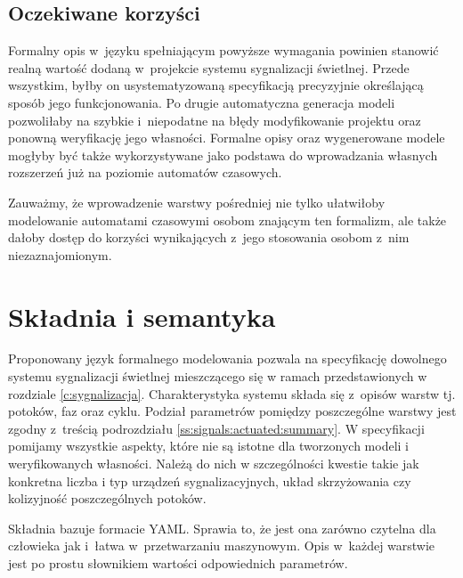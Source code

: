 \documentclass{pracamgr}
\theoremstyle{plain}
\begin{document}
\subsection{Oczekiwane korzyści}
\label{ss:lang:req:benefits}
Formalny opis w~języku spełniającym powyższe wymagania powinien
stanowić realną wartość dodaną w~projekcie systemu sygnalizacji
świetlnej. Przede wszystkim, byłby on usystematyzowaną
specyfikacją precyzyjnie określającą sposób jego funkcjonowania. Po
drugie automatyczna generacja modeli pozwoliłaby na szybkie
i~niepodatne na błędy modyfikowanie projektu oraz ponowną weryfikację jego
własności. Formalne opisy oraz wygenerowane modele mogłyby być także
wykorzystywane jako podstawa do wprowadzania własnych rozszerzeń już
na poziomie automatów czasowych.

Zauważmy, że wprowadzenie warstwy pośredniej nie tylko ułatwiłoby
modelowanie automatami czasowymi osobom znającym ten formalizm, ale
także dałoby dostęp do korzyści wynikających z~jego stosowania osobom
z~nim niezaznajomionym.


\section{Składnia i semantyka}
\label{c:lang:lang}

Proponowany język formalnego modelowania pozwala na specyfikację
dowolnego systemu sygnalizacji świetlnej mieszczącego się w ramach
przedstawionych w rozdziale \ref{c:sygnalizacja}. Charakterystyka
systemu składa się z~opisów warstw tj. potoków, faz oraz
cyklu. Podział parametrów pomiędzy poszczególne warstwy jest zgodny
z~treścią podrozdziału \ref{ss:signals:actuated:summary}. W
specyfikacji pomijamy wszystkie aspekty, które nie są istotne dla
tworzonych modeli i weryfikowanych własności. Należą do nich w
szczególności kwestie takie jak konkretna liczba i typ urządzeń
sygnalizacyjnych, układ skrzyżowania czy kolizyjność poszczególnych
potoków.

Składnia bazuje formacie YAML\cite{YAML}. Sprawia to, że jest ona
zarówno czytelna dla człowieka jak i~łatwa w~przetwarzaniu
maszynowym. Opis w~każdej warstwie jest po prostu słownikiem wartości
odpowiednich parametrów.
\end{document}
